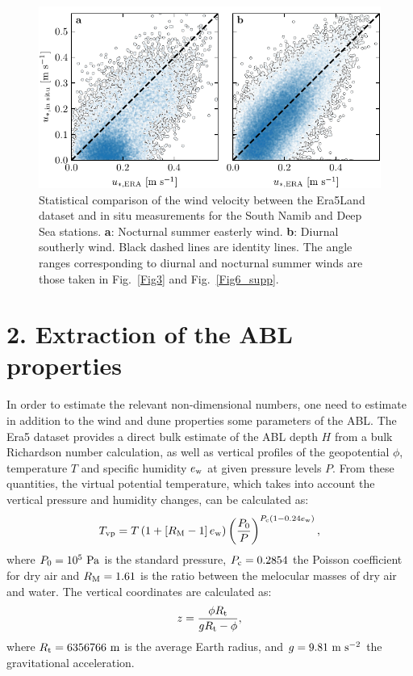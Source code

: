 \begin{figure}
  \centering
  \includegraphics[scale=1]{Figures/Figure8_supp.pdf}
  \caption{Statistical comparison of the wind velocity between the Era5Land dataset and in situ measurements for the South Namib and Deep Sea stations. \textbf{a}: Nocturnal summer easterly wind. \textbf{b}: Diurnal southerly wind. Black dashed lines are identity lines. The angle ranges corresponding to diurnal and nocturnal summer winds are those taken in Fig.~\ref{Fig3} and Fig.~\ref{Fig6_supp}.}
  \label{Fig8_supp}
\end{figure}

\section*{2. Extraction of the ABL properties}

In order to estimate the relevant non-dimensional numbers, one need to estimate in addition to the wind and dune properties some parameters of the ABL. The Era5 dataset provides a direct bulk estimate of the ABL depth $H$ from a bulk Richardson number calculation, as well as vertical profiles of the geopotential $\phi$, temperature $T$ and specific humidity $e_{\textup{w}}$ at given pressure levels $P$. From these quantities, the virtual potential temperature, which takes into account the vertical pressure and humidity changes, can be calculated as:
\begin{equation}
  T_{\textup{vp}} = T\left(1 + \left[R_{\textup{M}} - 1\right]e_{\textup{w}}\right)\left(\frac{P_{0}}{P}\right)^{P_{\textup{c}}(1 - 0.24e_{\textup{w}})},
\end{equation}
where $P_{0} = 10^{5}~\textup{Pa}$ is the standard pressure, $P_{\textup{c}} = 0.2854$ the Poisson coefficient for dry air and $R_{\textup{M}}=1.61$ is the ratio between the melocular masses of dry air and water. The vertical coordinates are calculated as:
\begin{equation}
  z = \frac{\phi R_{\textup{t}}}{g R_{\textup{t}} - \phi},
\end{equation}
where $R_{\textup{t}} = 6356766~\textup{m}$ is the average Earth radius, and $g = 9.81~\textup{m}~\textup{s}^{-2}$ the gravitational acceleration.

